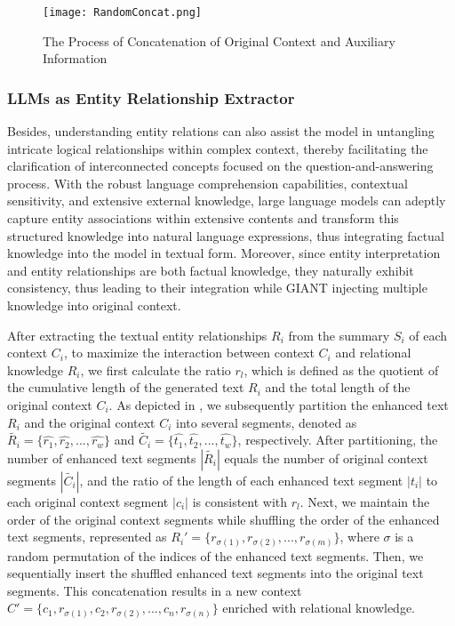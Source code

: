 \begin{figure}[h]
	\centering
	\texttt{[image: RandomConcat.png]}
	\caption{The Process of Concatenation of Original Context and Auxiliary Information}
	\label{fig:random_concatenate}
\end{figure}  

\subsubsection{LLMs as Entity Relationship Extractor}
\label{sec:llm_as_relationship_extrator}
 Besides, understanding entity relations can also assist the model in untangling intricate logical relationships within complex context, thereby facilitating the clarification of interconnected concepts focused on the question-and-answering process.
 With the robust language comprehension capabilities, contextual sensitivity, and extensive external knowledge, large language models can adeptly capture entity associations within extensive contents and transform this structured knowledge into natural language expressions, thus integrating factual knowledge into the model in textual form. 
 Moreover, since entity interpretation and entity relationships are both factual knowledge, they naturally exhibit consistency, thus leading to their integration while GIANT injecting multiple knowledge into original context.
 
 After extracting the textual entity relationships $R_i$ from the summary $S_i$ of each context $C_i$, to maximize the interaction between context $C_i$ and relational knowledge $R_i$, we first calculate the ratio $r_l$, which is defined as the quotient of the cumulative length of the generated text $R_i$ and the total length of the original context $C_i$. 
 As depicted in , we subsequently partition the enhanced text $R_i$ and the original context $C_i$ into several segments, denoted as $\tilde{R_i} = \{\hat{r_1}, \hat{r_2}, ..., \hat{r_w}\}$ and $\tilde{C_i} = \{\hat{t_1}, \hat{t_2}, ..., \hat{t_w}\}$, respectively.
 After partitioning, the number of enhanced text segments $|\tilde{R_i}|$ equals the number of original context segments $|\tilde{C_i}|$, and the ratio of the length of each enhanced text segment $|t_i|$ to each original context segment $|c_i|$ is consistent with $r_l$. 
 Next, we maintain the order of the original context segments while shuffling the order of the enhanced text segments, represented as $R_i' = \{r_{\sigma(1)}, r_{\sigma(2)}, ..., r_{\sigma(m)}\}$, where $\sigma$ is a random permutation of the indices of the enhanced text segments. Then, we sequentially insert the shuffled enhanced text segments into the original text segments. This concatenation results in a new context $C' = \{c_1, r_{\sigma(1)}, c_2, r_{\sigma(2)}, ..., c_n, r_{\sigma(n)}\}$ enriched with relational knowledge.
 
